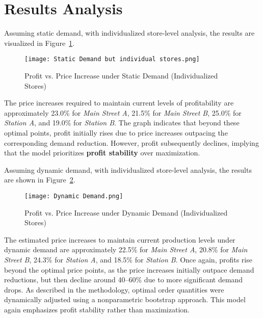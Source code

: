\documentclass[a4paper,12pt]{article}
\begin{document}
\section*{\centering Results Analysis}


Assuming static demand, with individualized store-level analysis, the results are visualized in Figure~\ref{fig:static}.

\begin{figure}[H]
    \centering
    \texttt{[image: Static Demand but individual stores.png]}
    \caption{Profit vs. Price Increase under Static Demand (Individualized Stores)}
    \label{fig:static}
\end{figure}


The price increases required to maintain current levels of profitability are approximately 23.0\% for \textit{Main Street A}, 21.5\% for \textit{Main Street B}, 25.0\% for \textit{Station A}, and 19.0\% for \textit{Station B}. The graph indicates that beyond these optimal points, profit initially rises due to price increases outpacing the corresponding demand reduction. However, profit subsequently declines, implying that the model prioritizes \textbf{profit stability} over maximization.

\vspace{1em}

Assuming dynamic demand, with individualized store-level analysis, the results are shown in Figure~\ref{fig:dynamic}.

\begin{figure}[H]
    \centering
    \texttt{[image: Dynamic Demand.png]}
    \caption{Profit vs. Price Increase under Dynamic Demand (Individualized Stores)}
    \label{fig:dynamic}
\end{figure}

The estimated price increases to maintain current production levels under dynamic demand are approximately 22.5\% for \textit{Main Street A}, 20.8\% for \textit{Main Street B}, 24.3\% for \textit{Station A}, and 18.5\% for \textit{Station B}. Once again, profits rise beyond the optimal price points, as the price increases initially outpace demand reductions, but then decline around 40--60\% due to more significant demand drops. As described in the methodology, optimal order quantities were dynamically adjusted using a nonparametric bootstrap approach. This model again emphasizes profit stability rather than maximization.
\end{document}

